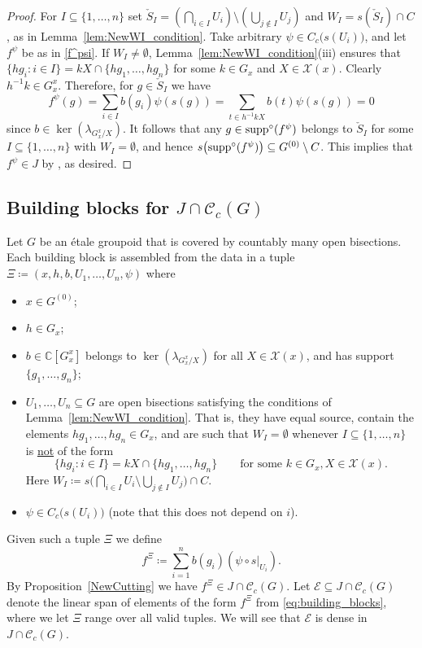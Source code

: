 \documentclass[11pt, oneside, reqno]{amsart}
\newcommand{\Gu}{G^{(0)}}
\newcommand{\cg}{\mathscr{C}_c(G)}
\newcommand{\supp}{{\rm supp}}
\newcommand{\osupp}{\supp^{\circ}}
\newcommand{\PRLsep}{\noindent\makebox[\linewidth]{\resizebox{0.3333\linewidth}{1pt}{$\bullet$}}\bigskip}
\theoremstyle{definition}
\theoremstyle{remark}
\numberwithin{equation}{section}
\begin{document}
\begin{proof}
    For $I \subseteq \{1, \dots, n\}$ set $\check{S}_I = (\bigcap_{i \in I} U_i) \setminus (\bigcup_{j \notin I} U_j)$ and $W_I = s(\check{S}_I) \cap C$, as in Lemma~\ref{lem:NewWI_condition}.
    Take arbitrary $\psi \in C_c\big(s(U_i)\big)$, and let $f^\psi$ be as in \eqref{f^psi}. If $W_I \neq \emptyset$, Lemma~\ref{lem:NewWI_condition}(iii) ensures that $\{hg_i \colon i \in I\} = kX\cap \{hg_1, \dots, hg_n\}$ for some $k \in G_x$ and $X \in \mathcal{X}(x)$. Clearly $h^{-1}k \in G^x_x$. Therefore, for $g \in \check{S}_I$ we have
    \[
    f^\psi(g) = \sum_{i \in I} b(g_i) \psi(s(g)) = \sum_{t \in h^{-1}kX} b(t) \psi(s(g)) = 0
    \]
    since $b \in \ker(\lambda_{G^x_x / X})$. It follows that any $g \in \osupp(f^\psi)$ belongs to $\check{S}_I$ for some $I \subseteq \{1, \dots, n\}$ with $W_I = \emptyset$, and hence $s\big(\osupp(f^\psi)\big) \subseteq \Gu \setminus C$. This implies that $f^\psi \in J$ by \cite[Proposition~7.18]{KM21}, as desired.
\end{proof}

\PRLsep

\subsection{Building blocks for $J \cap \cg$}\label{subsec:BuildingBlocksJcg}
Let $G$ be an \'etale groupoid that is covered by countably many open bisections. Each building block is assembled from the data in a tuple $\Xi \coloneq (x, h, b, U_1, \dots, U_n, \psi)$ where
\begin{itemize}
    \item $x \in \Gu$;
    \item $h \in G_x$;
    \item $b \in \mathbb{C}[G^x_x]$ belongs to $\ker(\lambda_{G^x_x/X})$ for all $X \in \mathcal{X}(x)$, and has support $\{g_1, \dots, g_n\}$;
    \item $U_1, \dots, U_n \subseteq G$ are open bisections satisfying the conditions of Lemma~\ref{lem:NewWI_condition}. That is, they have equal source, contain the elements $hg_1, \dots, hg_n \in G_x$, and are such that $W_I = \emptyset$ whenever $I \subseteq \{1, \dotsc, n\}$ is \underline{not} of the form
        \[
        \{hg_i \colon i \in I\} = kX\cap \{hg_1, \dots, hg_n\} \quad \quad \text{for some } k \in G_{x}, X \in \mathcal{X}(x).
        \]
    Here $W_I \coloneq s\big( \bigcap_{i \in I} U_i \setminus \bigcup_{j \notin I} U_j \big) \cap C$. 
    \item $\psi \in C_c\big(s(U_i)\big)$ (note that this does not depend on $i$).
\end{itemize}
Given such a tuple $\Xi$ we define
\begin{equation}\label{eq:building_blocks}
f^\Xi \coloneq \sum_{i=1}^n b(g_i) (\psi \circ s \vert_{U_i}).
\end{equation}
By Proposition~\ref{NewCutting} we have $f^\Xi \in J \cap \cg$. Let $\mathcal{E} \subseteq J \cap \cg$ denote the linear span of elements of the form $f^\Xi$ from \eqref{eq:building_blocks}, where we let $\Xi$ range over all valid tuples. We will see that $\mathcal{E}$ is dense in $J \cap \cg$.
\end{document}

